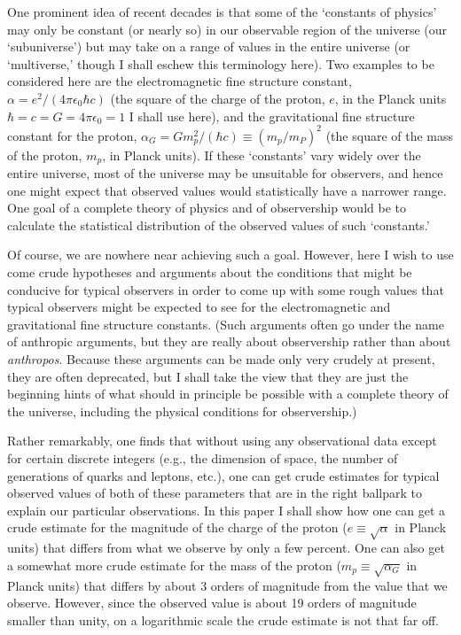 \documentclass[a4paper,12pt]{article}
\begin{document}
	One prominent idea of recent decades is that
some of the `constants of physics' may only be constant
(or nearly so) in our observable region of the universe
(our `subuniverse')
but may take on a range of values in the entire universe
(or `multiverse,' though I shall eschew this terminology here).
Two examples to be considered here are the electromagnetic
fine structure constant, $\alpha = e^2/(4\pi\epsilon_0\hbar c)$
(the square of the charge of the proton, $e$, in
the Planck units $\hbar = c = G = 4\pi\epsilon_0 = 1$
I shall use here), 
and the gravitational fine structure constant for the proton,
$\alpha_G = Gm_p^2/(\hbar c) \equiv (m_p/m_P)^2$
(the square of the mass of the proton, $m_p$, in Planck units).
If these `constants' vary widely over the entire universe,
most of the universe may be unsuitable for observers,
and hence one might expect that observed values would
statistically have a narrower range.
One goal of a complete theory of physics and of observership
would be to calculate the statistical distribution of
the observed values of such `constants.'

	Of course, we are nowhere near achieving such a goal.
However, here I wish to use come crude hypotheses and arguments
about the conditions that might be conducive for typical observers
in order to come up with some rough values that typical observers
might be expected to see for the electromagnetic and gravitational
fine structure constants.  (Such arguments often go under the name
of anthropic arguments, but they are really about observership
rather than about {\it anthropos}.  Because these arguments can be made
only very crudely at present, they are often deprecated,
but I shall take the view that they are just the beginning hints
of what should in principle be possible with a complete theory
of the universe, including the physical conditions for observership.)

	Rather remarkably, one finds that
without using any observational data except for certain discrete
integers (e.g., the dimension of space, the number of generations
of quarks and leptons, etc.), one can get crude estimates
for typical observed values of both of these parameters
that are in the right ballpark to explain our particular observations.
In this paper I shall show how one can get a crude estimate
for the magnitude of the charge of the proton
($e \equiv \sqrt{\alpha}$ in Planck units)
that differs from what we observe by only a few percent.
One can also get a somewhat more crude estimate
for the mass of the proton ($m_p \equiv \sqrt{\alpha_G}$ in Planck units)
that differs by about 3 orders of magnitude
from the value that we observe.
However, since the observed value is about 19 orders
of magnitude smaller than unity,
on a logarithmic scale the crude estimate is not that far off.
\end{document}
